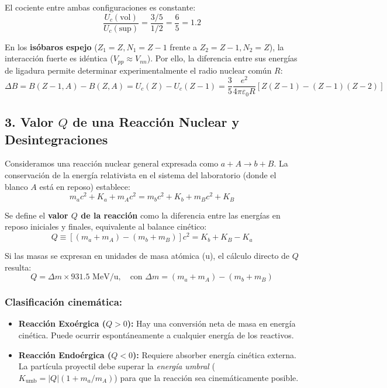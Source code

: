 El cociente entre ambas configuraciones es constante:
\begin{equation}
\frac{U_c(\text{vol})}{U_c(\text{sup})} = \frac{3/5}{1/2} = \frac{6}{5} = 1.2
\end{equation}

En los \textbf{isóbaros espejo} ($Z_1 = Z, N_1 = Z-1$ frente a $Z_2 = Z-1, N_2 = Z$), la interacción fuerte es idéntica ($V_{pp} \approx V_{nn}$). Por ello, la diferencia entre sus energías de ligadura permite determinar experimentalmente el radio nuclear común $R$:
\begin{equation}
\Delta B = B(Z-1, A) - B(Z, A) = U_c(Z) - U_c(Z-1) = \frac{3}{5} \frac{e^2}{4\pi\varepsilon_0 R} \left[ Z(Z-1) - (Z-1)(Z-2) \right]
\end{equation}

\subsection*{3. Valor $Q$ de una Reacción Nuclear y Desintegraciones}

Consideramos una reacción nuclear general expresada como $a + A \longrightarrow b + B$. La conservación de la energía relativista en el sistema del laboratorio (donde el blanco $A$ está en reposo) establece:
\begin{equation}
m_a c^2 + K_a + m_A c^2 = m_b c^2 + K_b + m_B c^2 + K_B
\end{equation}

Se define el \textbf{valor $Q$ de la reacción} como la diferencia entre las energías en reposo iniciales y finales, equivalente al balance cinético:
\begin{equation}
Q \equiv \left[ (m_a + m_A) - (m_b + m_B) \right] c^2 = K_b + K_B - K_a
\end{equation}

Si las masas se expresan en unidades de masa atómica ($\text{u}$), el cálculo directo de $Q$ resulta:
\begin{equation}
Q = \Delta m \times 931.5\text{ MeV/u}, \quad \text{con } \Delta m = (m_a + m_A) - (m_b + m_B)
\end{equation}

\subsubsection*{Clasificación cinemática:}
\begin{itemize}
    \item \textbf{Reacción Exoérgica ($Q > 0$):} Hay una conversión neta de masa en energía cinética. Puede ocurrir espontáneamente a cualquier energía de los reactivos.
    \item \textbf{Reacción Endoérgica ($Q < 0$):} Requiere absorber energía cinética externa. La partícula proyectil debe superar la \textit{energía umbral} ($K_{\text{umb}} = |Q| (1 + m_a/m_A)$) para que la reacción sea cinemáticamente posible.
\end{itemize}

